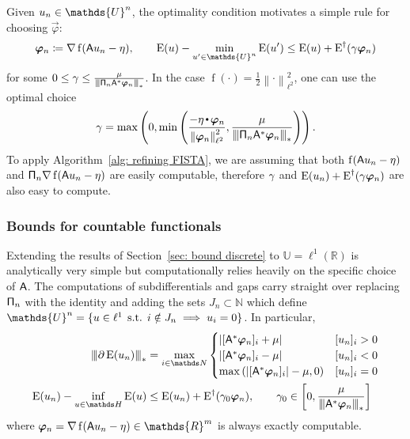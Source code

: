 \documentclass[smallextended]{svjour3}
\let\F\mathds\let\C\mathcal\newcommand{\R}{\F{R}}\newcommand{\A}{\tens{A}}
\newcommand{\norm}[1]{{\left\lVert #1 \right\rVert}}
\newcommand{\Norm}[1]{{\left\vert\kern-0.25ex\left\vert\kern-0.25ex\left\vert #1 \right\vert\kern-0.25ex\right\vert\kern-0.25ex\right\vert}}
\newcommand{\ip}[2]{#1 \vcenter{\hbox{\resizebox{6pt}{!}{\ensuremath\cdot}}} #2}
\newcommand{\op}[1]{\operatorname{#1}}
\newcommand{\1}{\F{1}}
\DeclareMathOperator{\st}{\;s.t.\;}
\newcommand{\Emin}[1][\var0]{\inf_{#1\in\F H}\op{E}(#1)}
\newcommand{\data}{\eta}
\newcommand*{\var}[1]{%
	\IfEqCase{#1}{%
		{0}{u}%
		{1}{v}%
		{2}{w}%
	}[u#1]%
}
\newcommand*{\vars}[1]{%
	\IfEqCase{#1}{%
		{0}{\alpha}%
		{1}{\beta}%
		{2}{\gamma}%
		{3}{a}%
		{4}{b}%
		{5}{c}%
	}[k#1]%
}
\begin{document}
	Given $\var0_n\in \F{U}^n$, the optimality condition motivates a simple rule for choosing $\vec{\varphi}$:
	\begin{equation}
		\vec{\varphi}_n\coloneqq \nabla\op{f}(\A\var0_n - \data), \qquad \op{E}(\var0)-\min_{\var0'\in\F{U}^n}\op{E}(\var0') \leq \op{E}(\var0) +\op{E}^\dag(\vars2\vec{\varphi}_n)
	\end{equation}
	for some $0\leq \vars2\leq\frac{\mu}{\Norm{\tens{\Pi}_n\A^*\vec{\varphi}_n}_*}$. In the case $\op{f}(\cdot)=\frac12\norm{\cdot}_{\ell^2}^2$, one can use the optimal choice
	\begin{equation}
		\vars2 =\max\left(0, \min\left(\frac{-\ip{\data}{\vec{\varphi}_n}}{\norm{\vec{\varphi}_n}_{\ell^2}^2}, \frac{\mu}{\Norm{\tens{\Pi}_n\A^*\vec{\varphi}_n}_*}\right)\right).
	\end{equation}
	To apply Algorithm~\ref{alg: refining FISTA}, we are assuming that both $\op{f}(\A\var0_n-\data)$ and $\tens{\Pi}_n\nabla\op{f}(\A\var0_n-\data)$ are easily computable, therefore $\vars2$ and $\op{E}(\var0_n) +\op{E}^\dag(\vars2\vec{\varphi}_n)$ are also easy to compute.
	
	\subsubsection{Bounds for countable functionals}
	Extending the results of Section~\ref{sec: bound discrete} to $\F{U}=\ell^1(\R)$ is analytically very simple but computationally relies heavily on the specific choice of $\A$. The computations of subdifferentials and gaps carry straight over replacing $\mathsf{\Pi}_n$ with the identity and adding the sets $J_n\subset\F N$ which define $\F{U}^n = \{\var0\in\ell^1\st i\notin J_n\implies \var0_i=0\}$. In particular,
	\begin{align}
		\Norm{\partial\op{E}(\var0_n)}_* &= \max_{i\in\F N}\begin{cases}
			|[\A^*\vec{\varphi}_n]_i + \mu| & [\var0_n]_i>0
			\\|[\A^*\vec{\varphi}_n]_i - \mu| & [\var0_n]_i<0
			\\\max\left(|[\A^*\vec{\varphi}_n]_i| - \mu, 0\right) & [\var0_n]_i = 0
		\end{cases}
		\\ \op{E}(\var0_n)-\Emin &\leq \op{E}(\var0_n) + \op{E}^\dag(\vars2_0\vec{\varphi}_n), \qquad \vars2_0\in\left[0,\frac{\mu}{\Norm{\A^*\vec{\varphi}_n}_*}\right]
	\end{align}
	where $\vec{\varphi}_n = \nabla\op{f}(\A\var0_n-\data)\in\R^m$ is always exactly computable.
	
\end{document}
